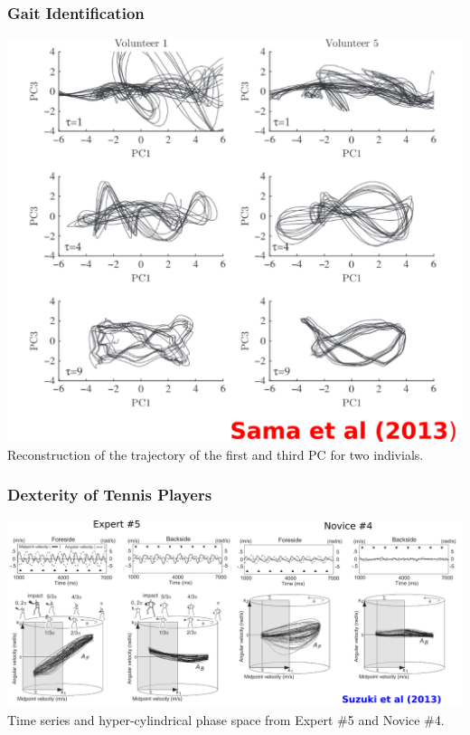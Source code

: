 \documentclass{beamer}
\begin{document}
\begin{frame}
\frametitle{Gait Identification}
\vspace{-0.5cm}
\begin{center}
\includegraphics[scale=.3]{sama2013}\\
Reconstruction of the trajectory of the first and third PC for two indivials.
\end{center}
\end{frame}



\begin{frame}
\frametitle{Dexterity of Tennis Players}
\vspace{-0.5cm}
\begin{center}
\includegraphics[scale=.2]{dexterity_tennis_suzuky2013}\\
Time series and hyper-cylindrical phase space from Expert \#5 and Novice \#4.
\end{center}
\end{frame}
\end{document}
